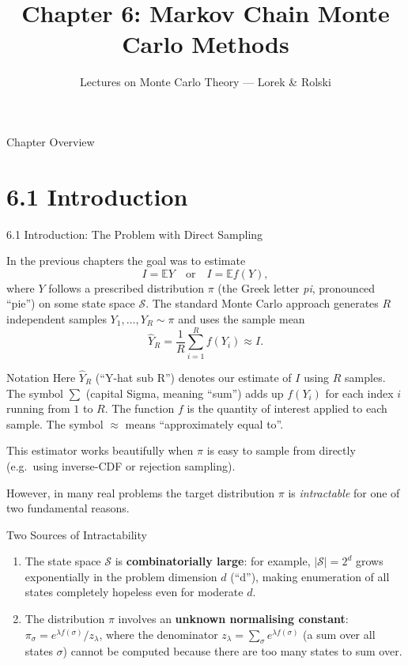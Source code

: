 \documentclass[aspectratio=169,10pt]{beamer}
\title[Chapter 6: MCMC]{Chapter 6: Markov Chain Monte Carlo Methods}
\subtitle{Lectures on Monte Carlo Theory --- Lorek \& Rolski}
\author{}
\date{}
\newcommand{\EE}{\mathbb{E}}
\begin{document}

\begin{frame}
  \titlepage
\end{frame}

\begin{frame}{Chapter Overview}
  \tableofcontents
\end{frame}

\section{6.1 Introduction}

\begin{frame}[allowframebreaks]{6.1 Introduction: The Problem with Direct Sampling}

In the previous chapters the goal was to estimate
\[
  I = \EE Y \quad \text{or} \quad I = \EE f(Y),
\]
where $Y$ follows a prescribed distribution $\pi$ (the Greek letter \emph{pi}, pronounced ``pie'') on some state space $\mathcal{S}$.
The standard Monte Carlo approach generates $R$ independent samples $Y_1, \ldots, Y_R \sim \pi$ and uses the sample mean
\[
  \hat{Y}_R = \frac{1}{R} \sum_{i=1}^{R} f(Y_i) \approx I.
\]

\begin{block}{Notation}
Here $\hat{Y}_R$ (``Y-hat sub R'') denotes our estimate of $I$ using $R$ samples.
The symbol $\sum$ (capital Sigma, meaning ``sum'') adds up $f(Y_i)$ for each index $i$ running from $1$ to $R$.
The function $f$ is the quantity of interest applied to each sample.
The symbol $\approx$ means ``approximately equal to''.
\end{block}

This estimator works beautifully when $\pi$ is easy to sample from directly (e.g.\ using inverse-CDF or rejection sampling).

\framebreak

However, in many real problems the target distribution $\pi$ is \emph{intractable} for one of two fundamental reasons.

\begin{block}{Two Sources of Intractability}
\begin{enumerate}
  \item The state space $\mathcal{S}$ is \textbf{combinatorially large}: for example, $|\mathcal{S}| = 2^d$ grows exponentially in the problem dimension $d$ (``d''), making enumeration of all states completely hopeless even for moderate $d$.
  \item The distribution $\pi$ involves an \textbf{unknown normalising constant}: $\pi_\sigma = e^{\lambda f(\sigma)}/z_\lambda$, where the denominator $z_\lambda = \sum_\sigma e^{\lambda f(\sigma)}$ (a sum over all states $\sigma$) cannot be computed because there are too many states to sum over.
\end{enumerate}
\end{block}


\end{frame}
\end{document}
